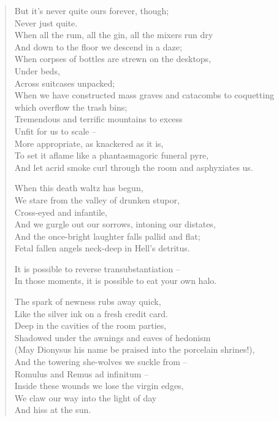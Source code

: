 \begin{verse}
  But it's never quite ours forever, though;\\
  Never just quite.\\
  When all the rum, all the gin, all the mixers run dry\\
  And down to the floor we descend in a daze;\\
  When corpses of bottles are strewn on the desktops,\\
  Under beds,\\
  Across suitcases unpacked;\\
  When we have constructed mass graves and catacombs to coquetting\\
  which overflow the trash bins;\\
  Tremendous and terrific mountains to excess\\
  Unfit for us to scale --\\
  More appropriate, as knackered as it is,\\
  To set it aflame like a phantasmagoric funeral pyre,\\
  And let acrid smoke curl through the room and asphyxiates us.\par

  When this death waltz has begun,\\
  We stare from the valley of drunken stupor,\\
  Cross-eyed and infantile,\\
  And we gurgle out our sorrows, intoning our distates,\\
  And the once-bright laughter falls pallid and flat;\\
  Fetal fallen angels neck-deep in Hell's detritus.\par

  It is possible to reverse transubstantiation --\\
  In those moments, it is possible to eat your own halo.\par

  The spark of newness rubs away quick,\\
  Like the silver ink on a fresh credit card.\\
  Deep in the cavities of the room parties,\\
  Shadowed under the awnings and eaves of hedonism\\
  (May Dionysus his name be praised into the porcelain shrines!),\\
  And the towering she-wolves we suckle from --\\
  Romulus and Remus ad infinitum --\\
  Inside these wounds we lose the virgin edges,\\
  We claw our way into the light of day\\
  And hiss at the sun.\par


\end{verse}
